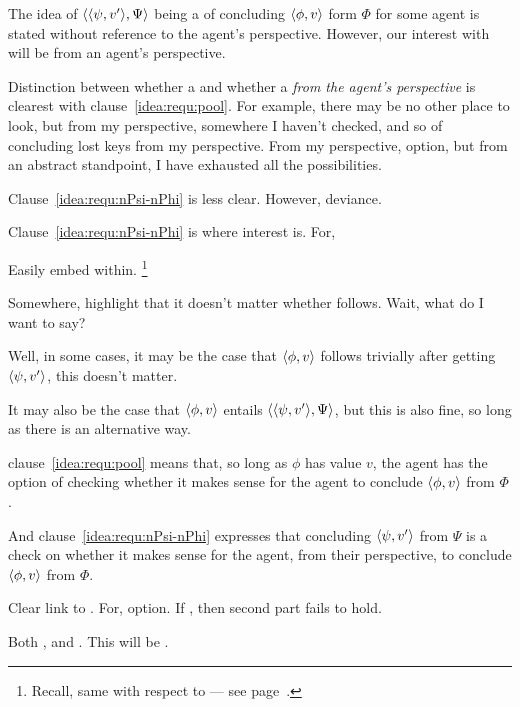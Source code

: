 \begin{note}
  The idea of \(\langle \langle \psi, v' \rangle, \Psi \rangle\) being a  of concluding \(\langle \phi, v \rangle\) form \(\Phi\) for some agent is stated without reference to the agent's perspective.
  However, our interest with  will be from an agent's perspective.

  Distinction between whether a \requ{} and whether a \requ{} \emph{from the agent's perspective} is clearest with clause~\ref{idea:requ:pool}.
  For example, there may be no other place to look, but from my perspective, somewhere I haven't checked, and so \requ{} of concluding lost keys from my perspective.
  From my perspective, option, but from an abstract standpoint, I have exhausted all the possibilities.

  Clause~\ref{idea:requ:nPsi-nPhi} is less clear.
  However, deviance.

  Clause~\ref{idea:requ:nPsi-nPhi} is where interest is.
  For, 



  Easily embed within.%
  \footnote{
    Recall, same with respect to  --- see page~\pageref{fcs-neutral-perspective}.
  }
\end{note}

\begin{note}
  \color{red}
  Somewhere, highlight that it doesn't matter whether \requ{} follows.
  Wait, what do I want to say?

  Well, in some cases, it may be the case that \(\langle \phi, v \rangle\) follows trivially after getting \(\langle \psi, v' \rangle\), this doesn't matter.

  It may also be the case that \(\langle \phi, v \rangle\) entails \(\langle \langle \psi, v' \rangle, \Psi \rangle\), but this is also fine, so long as there is an alternative way.
\end{note}

\begin{note}
  \color{red}

  clause~\ref{idea:requ:pool} means that, so long as \(\phi\) has value \(v\), the agent has the option of checking whether it makes sense for the agent to conclude \(\langle \phi, v \rangle\) from \(\Phi\).

  And clause~\ref{idea:requ:nPsi-nPhi} expresses that concluding \(\langle \psi, v' \rangle\) from \(\Psi\) is a check on whether it makes sense for the agent, from their perspective, to conclude \(\langle \phi, v \rangle\) from \(\Phi\).

\end{note}

\begin{note}
  Clear link to .
  For,  option.
  If , then second part fails to hold.

  Both \requ{}, and \fc{}.
  This will be \qzS{}.
\end{note}

